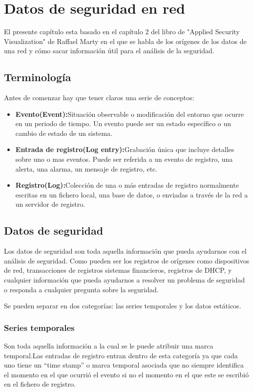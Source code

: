 \chapter{Datos de seguridad en red}
El presente capítulo esta basado en el capítulo 2 del libro de "Applied Security Visualization" de Raffael Marty en el que se habla de los orígenes de los datos de una red y cómo sacar información útil para el análisis de la seguridad.
 
\bigskip

\section{Terminología} \cite{ASV}
Antes de comenzar hay que tener claros una serie de conceptos:
\begin{itemize}
\item \textbf{Evento(Event):}Situación observable o modificación del entorno que ocurre en un periodo de tiempo. Un evento puede ser un estado específico o un cambio de estado de un sistema.
\item \textbf{Entrada de registro(Log entry):}Grabación única que incluye detalles sobre uno o mas eventos. Puede ser referida a un evento de registro,  una alerta, una alarma, un mensaje de registro, etc.
\item \textbf{Registro(Log):}Colección de una o más entradas de registro normalmente escritas en un fichero local, una base de datos, o enviadas a través de la red a un servidor de registro.
\end{itemize}
\bigskip

\section{Datos de seguridad}\cite{ASV}
Los datos de seguridad son toda aquella información que pueda ayudarnos con el análisis de seguridad. Como pueden ser los registros de orígenes como dispositivos de red, transacciones de registros sistemas financieros, registros de DHCP, y cualquier información que pueda ayudarnos a resolver un problema de seguridad o responda a cualquier pregunta sobre la seguridad.
\bigskip

Se pueden separar en dos categorías: las series temporales y los datos estáticos.
\bigskip

\subsection{Series temporales}
Son toda aquella información a la cual se le puede atribuir una marca temporal.Las entradas de registro entran dentro de esta categoría ya que cada uno tiene un “time stamp” o marca temporal asociada que no siempre identifica el momento en el que ocurrió el evento si no el momento en el que este se escribió en el fichero de registro.
\bigskip

